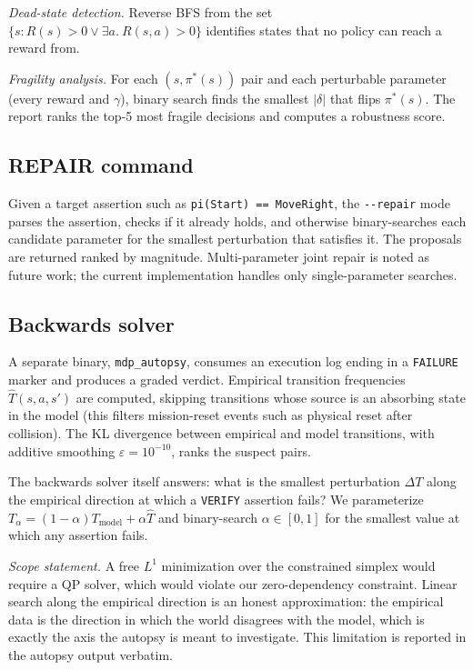 \documentclass[conference]{IEEEtran}
\begin{document}
\emph{Dead-state detection.} Reverse BFS from the set
$\{s : R(s) > 0 \lor \exists a.\ R(s, a) > 0\}$ identifies states
that no policy can reach a reward from.

\emph{Fragility analysis.} For each $(s, \pi^*(s))$ pair and each
perturbable parameter (every reward and $\gamma$), binary search
finds the smallest $|\delta|$ that flips $\pi^*(s)$. The report
ranks the top-5 most fragile decisions and computes a robustness
score.

\subsection{REPAIR command}

Given a target assertion such as \texttt{pi(Start) == MoveRight},
the \texttt{-{}-repair} mode parses the assertion, checks if it
already holds, and otherwise binary-searches each candidate
parameter for the smallest perturbation that satisfies it. The
proposals are returned ranked by magnitude. Multi-parameter joint
repair is noted as future work; the current implementation handles
only single-parameter searches.

\subsection{Backwards solver}

A separate binary, \texttt{mdp\_autopsy}, consumes an execution log
ending in a \texttt{FAILURE} marker and produces a graded verdict.
Empirical transition frequencies $\hat T(s, a, s')$ are computed,
skipping transitions whose source is an absorbing state in the
model (this filters mission-reset events such as physical reset
after collision). The KL divergence between empirical and model
transitions, with additive smoothing $\varepsilon = 10^{-10}$,
ranks the suspect pairs.

The backwards solver itself answers: what is the smallest
perturbation $\Delta T$ along the empirical direction at which a
\texttt{VERIFY} assertion fails? We parameterize
$T_\alpha = (1 - \alpha) T_\text{model} + \alpha \hat T$ and
binary-search $\alpha \in [0, 1]$ for the smallest value at which
any assertion fails.

\emph{Scope statement.} A free $L^1$ minimization over the
constrained simplex would require a QP solver, which would violate
our zero-dependency constraint. Linear search along the empirical
direction is an honest approximation: the empirical data is the
direction in which the world disagrees with the model, which is
exactly the axis the autopsy is meant to investigate. This
limitation is reported in the autopsy output verbatim.
\end{document}
